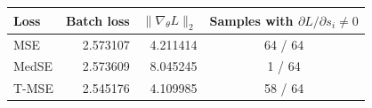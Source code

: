 \begin{tabular}{lrrc}
\toprule
Loss & Batch loss & $\|\nabla_\theta L\|_2$ & Samples with $\partial L/\partial s_i \neq 0$ \\
\midrule
MSE & 2.573107 & 4.211414 & 64 / 64 \\
MedSE & 2.573609 & 8.045245 & 1 / 64 \\
T-MSE & 2.545176 & 4.109985 & 58 / 64 \\
\bottomrule
\end{tabular}